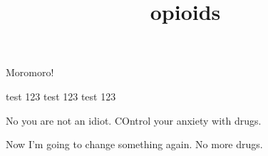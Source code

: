 \documentclass[10pt]{article}
\begin{document}
\title{opioids }
\maketitle

Moromoro!

test 123 test 123 test 123

No you are not an idiot.  
COntrol your anxiety with drugs.  

Now I'm going to change something again.  No more drugs.
\end{document}
